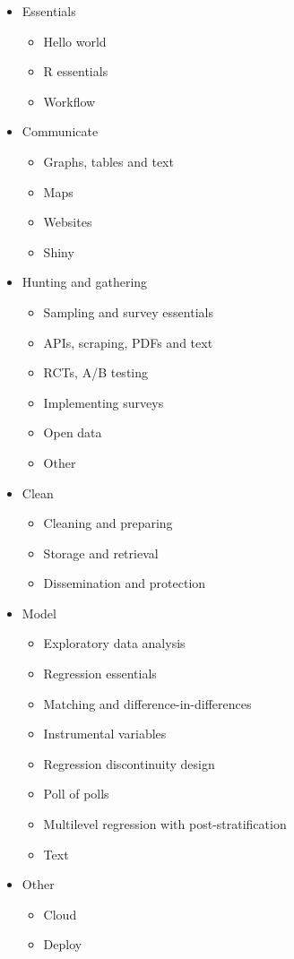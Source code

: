 \documentclass[
]{book}
\providecommand{\tightlist}{%
  \setlength{\itemsep}{0pt}\setlength{\parskip}{0pt}}
\begin{document}
\begin{itemize}
\tightlist
\item
  Essentials

  \begin{itemize}
  \tightlist
  \item
    Hello world
  \item
    R essentials
  \item
    Workflow
  \end{itemize}
\item
  Communicate

  \begin{itemize}
  \tightlist
  \item
    Graphs, tables and text
  \item
    Maps
  \item
    Websites
  \item
    Shiny
  \end{itemize}
\item
  Hunting and gathering

  \begin{itemize}
  \tightlist
  \item
    Sampling and survey essentials
  \item
    APIs, scraping, PDFs and text
  \item
    RCTs, A/B testing
  \item
    Implementing surveys
  \item
    Open data
  \item
    Other
  \end{itemize}
\item
  Clean

  \begin{itemize}
  \tightlist
  \item
    Cleaning and preparing
  \item
    Storage and retrieval
  \item
    Dissemination and protection
  \end{itemize}
\item
  Model

  \begin{itemize}
  \tightlist
  \item
    Exploratory data analysis
  \item
    Regression essentials
  \item
    Matching and difference-in-differences
  \item
    Instrumental variables
  \item
    Regression discontinuity design
  \item
    Poll of polls
  \item
    Multilevel regression with post-stratification
  \item
    Text
  \end{itemize}
\item
  Other

  \begin{itemize}
  \tightlist
  \item
    Cloud
  \item
    Deploy
  \end{itemize}
\end{itemize}
\end{document}
